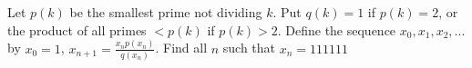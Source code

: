 Let $p(k)$ be the smallest prime not dividing $k$. Put $q(k) = 1$ if $p(k) = 2$, or the product of all primes $< p(k)$ if $p(k) > 2$. Define the sequence $x_0, x_1, x_2, ...$ by $x_0 = 1$, $x_{n+1} = \frac{x_np(x_n)}{q(x_n)}$. Find all $n$ such that $x_n = 111111$